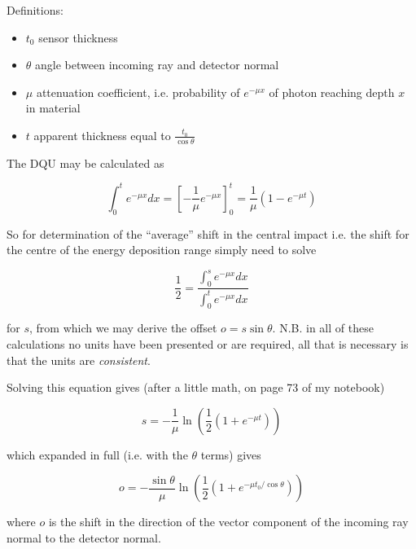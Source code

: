 \documentclass{article}
\begin{document}
\noindent
Definitions:
\begin{itemize}
\item{$t_0$ sensor thickness}
\item{$\theta$ angle between incoming ray and detector normal}
\item{$\mu$ attenuation coefficient, i.e. probability of $e^{-\mu x}$ of photon reaching depth $x$ in material}
\item{$t$ apparent thickness equal to $\frac{t_0}{\cos \theta}$}
\end{itemize}

\noindent
The DQU may be calculated as

\begin{equation}
\int_0^t e^{-\mu x} dx = \left[ - \frac{1}{\mu} e^{-\mu x} \right]_0^t = 
\frac{1}{\mu} \left( 1 - e^{-\mu t} \right)
\end{equation}

So for determination of the ``average'' shift in the central impact i.e. the shift for the centre of the energy deposition range simply need to solve 

\begin{equation}
\frac{1}{2} = \frac{\int_0^s e^{-\mu x} dx}{\int_0^t e^{-\mu x} dx}
\end{equation}

\noindent
for $s$, from which we may derive the offset $o = s \sin \theta$. N.B. in all of these calculations no units have been presented or are required, all that is necessary is that the units are \emph{consistent}.

Solving this equation gives (after a little math, on page 73 of my notebook)

\begin{equation}
s = - \frac{1}{\mu} \ln \left( \frac{1}{2} \left( 1 + e^{-\mu t} \right) \right)
\end{equation}

\noindent
which expanded in full (i.e. with the $\theta$ terms) gives

\begin{equation}
o = - \frac{\sin \theta}{\mu} \ln \left( \frac{1}{2} \left( 1 + e^{-\mu t_0 / \cos \theta} \right) \right)
\end{equation}

\noindent
where $o$ is the shift in the direction of the vector component of the incoming ray normal to the detector normal.
\end{document}
